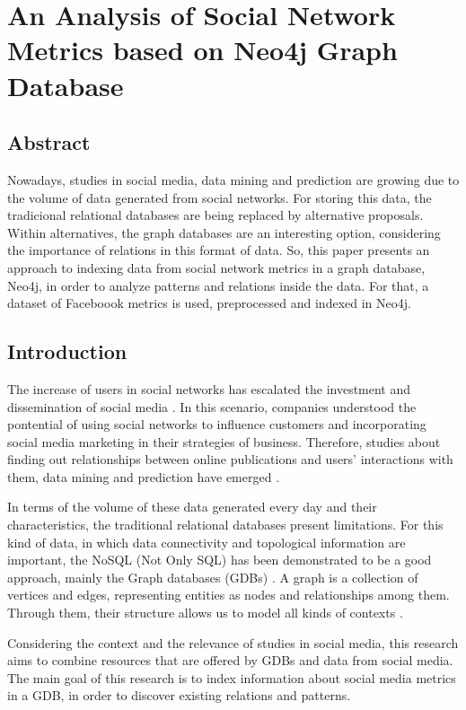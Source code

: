 \section{An Analysis of Social Network Metrics based on Neo4j Graph
Database}\label{an-analysis-of-social-network-metrics-based-on-neo4j-graph-database}

\subsection{Abstract}\label{abstract}

Nowadays, studies in social media, data mining and prediction are
growing due to the volume of data generated from social networks. For
storing this data, the tradicional relational databases are being
replaced by alternative proposals. Within alternatives, the graph
databases are an interesting option, considering the importance of
relations in this format of data. So, this paper presents an approach to
indexing data from social network metrics in a graph database, Neo4j, in
order to analyze patterns and relations inside the data. For that, a
dataset of Faceboook metrics is used, preprocessed and indexed in Neo4j.

\subsection{Introduction}\label{introduction}

The increase of users in social networks has escalated the investment
and dissemination of social media \cite{social}. In this scenario,
companies understood the pontential of using social networks to
influence customers and incorporating social media marketing in their
strategies of business. Therefore, studies about finding out
relationships between online publications and users' interactions with
them, data mining and prediction have emerged \cite{social}.

In terms of the volume of these data generated every day and their
characteristics, the traditional relational databases present
limitations. For this kind of data, in which data connectivity and
topological information are important, the NoSQL (Not Only SQL) has been
demonstrated to be a good approach, mainly the Graph databases (GDBs)
\cite{neo4j}. A graph is a collection of vertices and edges,
representing entities as nodes and relationships among them. Through
them, their structure allows us to model all kinds of contexts
\cite{graphDB}.

Considering the context and the relevance of studies in social media,
this research aims to combine resources that are offered by GDBs and
data from social media. The main goal of this research is to index
information about social media metrics in a GDB, in order to discover
existing relations and patterns.

